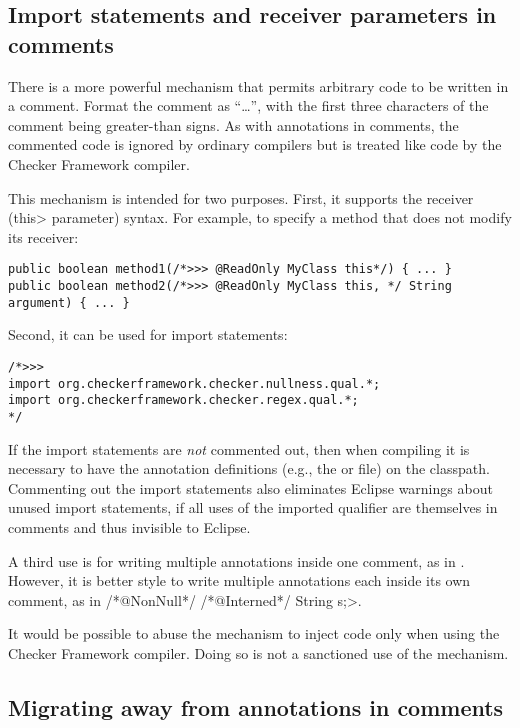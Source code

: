 \subsection{Import statements and receiver parameters in comments\label{receivers-and-imports-in-comments}}

There is a more powerful mechanism that permits arbitrary code to be
written in a comment.  Format the comment as ``\code{/*>>>}\ldots\code{*/}'',
with the first three characters of the comment being greater-than signs. As
with annotations in comments, the commented code is ignored by ordinary
compilers but is treated like code by the
Checker Framework compiler.

This mechanism is intended for two purposes.
First, it supports the receiver (\<this> parameter) syntax.  For example,
to specify a method that does not modify its receiver:

\begin{Verbatim}
public boolean method1(/*>>> @ReadOnly MyClass this*/) { ... }
public boolean method2(/*>>> @ReadOnly MyClass this, */ String argument) { ... }
\end{Verbatim}

Second, it can be used for import statements:

\begin{Verbatim}
/*>>>
import org.checkerframework.checker.nullness.qual.*;
import org.checkerframework.checker.regex.qual.*;
*/
\end{Verbatim}

\noindent
If the import statements are \emph{not} commented out, then when compiling
it is necessary to have the annotation definitions (e.g., the
 or  file) on the classpath.
Commenting out the import statements also eliminates Eclipse
warnings about unused import statements, if all uses of the imported
qualifier are themselves in comments and thus invisible to Eclipse.

A third use is for writing multiple annotations inside one
comment, as in .
However, it is better style to write multiple annotations each
inside its own comment, as in \</*@NonNull*/ /*@Interned*/ String s;>.

It would be possible to abuse the  mechanism to inject
code only when using
the Checker Framework compiler.  Doing so is not a sanctioned use of the
mechanism.


\subsection{Migrating away from annotations in comments\label{uncommenting-annotations}}

